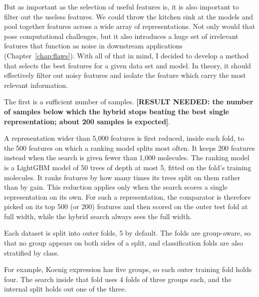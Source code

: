 But as important as the selection of useful features is, it is also important to filter out the useless features. We could throw the kitchen sink at the models and pool together features across a wide array of representations. Not only would that pose computational challenges, but it also introduces a huge set of irrelevant features that function as noise in downstream applications (Chapter~\ref{chap:flaws}). With all of that in mind, I decided to develop a method that selects the best features for a given data set and model. In theory, it should effectively filter out noisy features and isolate the feature which carry the most relevant information.

The first is a sufficient number of samples. \textbf{[RESULT NEEDED: the number of samples below which the hybrid stops beating the best single representation; about 200 samples is expected]}.

A representation wider than 5,000 features is first reduced, inside each fold, to the 500 features on which a ranking model splits most often. It keeps 200 features instead when the search is given fewer than 1,000 molecules. The ranking model is a LightGBM model of 50 trees of depth at most 5, fitted on the fold's training molecules. It ranks features by how many times its trees split on them rather than by gain. This reduction applies only when the search scores a single representation on its own.
For such a representation, the comparator is therefore picked on its top 500 (or 200) features and then scored on the outer test fold at full width, while the hybrid search always sees the full width.

Each dataset is split into outer folds, 5 by default. The folds are group-aware, so that no group appears on both sides of a split, and classification folds are also stratified by class.

For example, Koenig expression has five groups, so each outer training fold holds four. The search inside that fold uses 4 folds of three groups each, and the internal split holds out one of the three.

